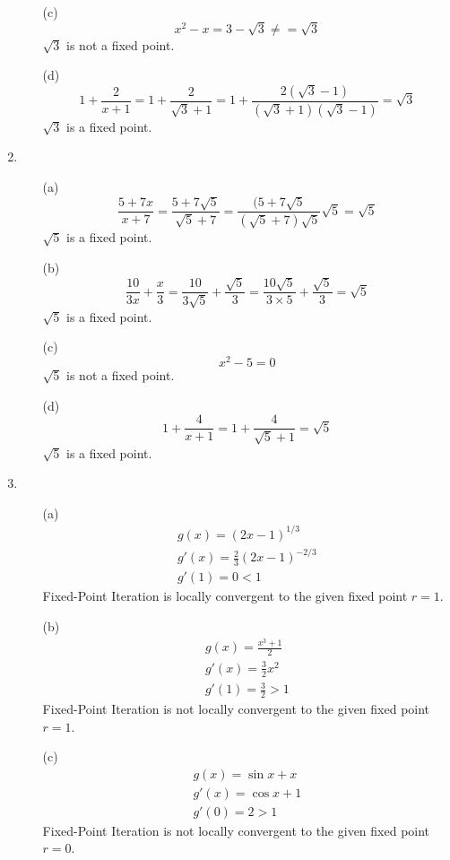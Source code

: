 \documentclass[UTF8]{ctexart}
\begin{document}
\begin{enumerate}
\begin{itemize}
\item[(c)]
\[
	x^2 - x = 3 - \sqrt{3} \ne = \sqrt{3}
\]
$\sqrt{3}$ is not a fixed point.

\item[(d)]
\[
	1 + \frac{2}{x + 1} = 1 + \frac{2}{\sqrt{3} + 1} = 1 + \frac{2(\sqrt{3} - 1)}{(\sqrt{3} + 1)(\sqrt{3} - 1)} = \sqrt{3}
\]
$\sqrt{3}$ is a fixed point.

\end{itemize}

\item \begin{itemize}
\item[(a)]
\[
	\frac{5 + 7x}{x + 7} = \frac{5 + 7\sqrt{5}}{\sqrt{5} + 7} = \frac{(5 + 7\sqrt{5}}{(\sqrt{5} + 7)\sqrt{5}}\sqrt{5} = \sqrt{5}
\]
$\sqrt{5}$ is a fixed point.

\item[(b)]
\[
	\frac{10}{3x} + \frac{x}{3} = \frac{10}{3\sqrt{5}} + \frac{\sqrt{5}}{3} = \frac{10\sqrt{5}}{3 \times 5} + \frac{\sqrt{5}}{3} = \sqrt{5}
\]
$\sqrt{5}$ is a fixed point.

\item[(c)]
\[
	x^2 - 5 = 0
\]
$\sqrt{5}$ is not a fixed point.

\item[(d)]
\[
	1 + \frac{4}{x + 1} = 1 + \frac{4}{\sqrt{5} + 1} = \sqrt{5}
\]
$\sqrt{5}$ is a fixed point.

\end{itemize}

\item 
\begin{itemize}
\item[(a)]
\begin{gather*}
g(x) = (2x - 1)^{1/3} \\
g'(x) = \frac{2}{3}(2x - 1)^{-2/3} \\
g'(1) = 0 < 1
\end{gather*}
Fixed-Point Iteration is locally convergent to the given fixed point $r=1$.

\item[(b)]
\begin{gather*}
g(x) = \frac{x^3 + 1}{2} \\
g'(x) = \frac{3}{2}x^2 \\
g'(1) = \frac{3}{2} > 1
\end{gather*}
Fixed-Point Iteration is not locally convergent to the given fixed point $r=1$.

\item[(c)]
\begin{gather*}
g(x) = \sin x + x \\
g'(x) = \cos x + 1 \\
g'(0) = 2 > 1
\end{gather*}
Fixed-Point Iteration is not locally convergent to the given fixed point $r=0$.


\end{itemize}
\end{enumerate}
\end{document}
